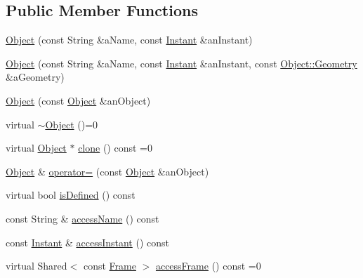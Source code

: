 \subsection*{Public Member Functions}
\begin{DoxyCompactItemize}
\item 
\hyperlink{classlibrary_1_1physics_1_1env_1_1_object_af112257aa51a94dcc61a36e2c0db4b05}{Object} (const String \&a\+Name, const \hyperlink{classlibrary_1_1physics_1_1time_1_1_instant}{Instant} \&an\+Instant)
\item 
\hyperlink{classlibrary_1_1physics_1_1env_1_1_object_a37e5ddc8f0b89e006025a7ac6ac71fe5}{Object} (const String \&a\+Name, const \hyperlink{classlibrary_1_1physics_1_1time_1_1_instant}{Instant} \&an\+Instant, const \hyperlink{classlibrary_1_1physics_1_1env_1_1_object_abdf50733c7ad97327fb64edca5670f13}{Object\+::\+Geometry} \&a\+Geometry)
\item 
\hyperlink{classlibrary_1_1physics_1_1env_1_1_object_ac7b0b65eb0f2a65a46314269687ad49e}{Object} (const \hyperlink{classlibrary_1_1physics_1_1env_1_1_object}{Object} \&an\+Object)
\item 
virtual \hyperlink{classlibrary_1_1physics_1_1env_1_1_object_a2b48d75c2f1a01e2808e9efe4fe68393}{$\sim$\+Object} ()=0
\item 
virtual \hyperlink{classlibrary_1_1physics_1_1env_1_1_object}{Object} $\ast$ \hyperlink{classlibrary_1_1physics_1_1env_1_1_object_a498e0d1a15e937a5aa77374c6f899768}{clone} () const =0
\item 
\hyperlink{classlibrary_1_1physics_1_1env_1_1_object}{Object} \& \hyperlink{classlibrary_1_1physics_1_1env_1_1_object_a1e7d9e24f984bcc13e89625805ae15aa}{operator=} (const \hyperlink{classlibrary_1_1physics_1_1env_1_1_object}{Object} \&an\+Object)
\item 
virtual bool \hyperlink{classlibrary_1_1physics_1_1env_1_1_object_a7035edc921681401ddd43b094645a024}{is\+Defined} () const
\item 
const String \& \hyperlink{classlibrary_1_1physics_1_1env_1_1_object_a0cf28bef038e493ee0771680976f5e28}{access\+Name} () const
\item 
const \hyperlink{classlibrary_1_1physics_1_1time_1_1_instant}{Instant} \& \hyperlink{classlibrary_1_1physics_1_1env_1_1_object_a3f183331fd0ad20e88cae41e2491a5dc}{access\+Instant} () const
\item 
virtual Shared$<$ const \hyperlink{classlibrary_1_1physics_1_1coord_1_1_frame}{Frame} $>$ \hyperlink{classlibrary_1_1physics_1_1env_1_1_object_a6ff59bc7375388118c60b5823dad748b}{access\+Frame} () const =0

\end{DoxyCompactItemize}
